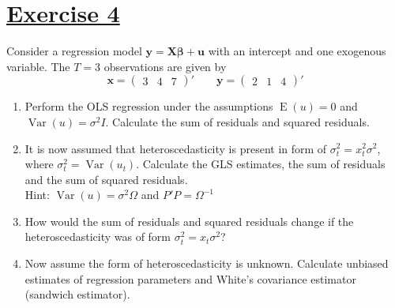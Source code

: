 \documentclass[captions=tableheading, 12pt, headings=small, parskip=half]{scrartcl}
\begin{document}
\section*{\underline{Exercise 4}}
Consider a regression model $\boldsymbol{y} = \boldsymbol{X}\boldsymbol{\beta} + \boldsymbol{u}$ with an intercept and one exogenous variable. The $T=3$ observations are given by
\[	
	\boldsymbol{x} = \begin{pmatrix}3&4&7\end{pmatrix}'\qquad
	\boldsymbol{y} = \begin{pmatrix} 2&1&4  \end{pmatrix}'
\] 
\begin{enumerate}[label = \alph*)]
	\item Perform the OLS regression under the assumptions $\operatorname{E}(u) = 0$ and $\operatorname{Var}(u) = \sigma^2I$. Calculate the sum of residuals and squared residuals.
	\item It is now assumed that heteroscedasticity is present in form of $\sigma_t^2 = x_t^2\sigma^2$, where $\sigma_t^2 = \operatorname{Var}(u_t)$. Calculate the GLS estimates, the sum of residuals and the sum of squared residuals.\\
	Hint: $\operatorname{Var}(u) = \sigma^2\Omega$ and $P'P = \Omega^{-1}$
	\item How would the sum of residuals and squared residuals change if the heteroscedasticity was of form $\sigma_t^2 = x_t\sigma^2$?
	\item Now assume the form of heteroscedasticity is unknown. Calculate unbiased estimates of regression parameters and White's covariance estimator (sandwich estimator).
\end{enumerate}
\newpage
\end{document}
